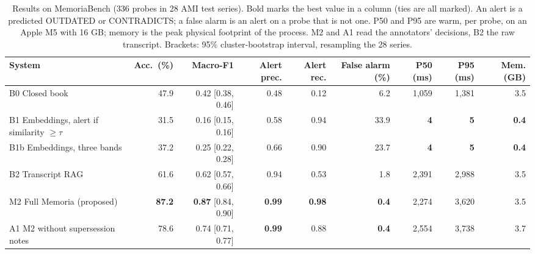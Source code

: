 \begin{table}[tbp]
\centering
\small
\caption{Results on MemoriaBench (336 probes in 28 AMI test series). Bold marks the best value in a column (ties are all marked). An alert is a predicted OUTDATED or CONTRADICTS; a false alarm is an alert on a probe that is not one. P50 and P95 are warm, per probe, on an Apple M5 with 16 GB; memory is the peak physical footprint of the process. M2 and A1 read the annotators' decisions, B2 the raw transcript. Brackets: 95\% cluster-bootstrap interval, resampling the 28 series.}
\label{tab:memoriabench-main}
\begin{tabular}{@{}lrrrrrrrr@{}}
\toprule
System & Acc.\ (\%) & Macro-F1 & Alert prec. & Alert rec. & False alarm (\%) & P50 (ms) & P95 (ms) & Mem. (GB) \\
\midrule
B0 Closed book & 47.9 & 0.42 {\scriptsize [0.38, 0.46]} & 0.48 & 0.12 & 6.2 & 1{,}059 & 1{,}381 & 3.5 \\
B1 Embeddings, alert if similarity $\ge \tau$ & 31.5 & 0.16 {\scriptsize [0.15, 0.16]} & 0.58 & 0.94 & 33.9 & \textbf{4} & \textbf{5} & \textbf{0.4} \\
B1b Embeddings, three bands & 37.2 & 0.25 {\scriptsize [0.22, 0.28]} & 0.66 & 0.90 & 23.7 & \textbf{4} & \textbf{5} & \textbf{0.4} \\
B2 Transcript RAG & 61.6 & 0.62 {\scriptsize [0.57, 0.66]} & 0.94 & 0.53 & 1.8 & 2{,}391 & 2{,}988 & 3.5 \\
\midrule
M2 Full Memoria (proposed) & \textbf{87.2} & \textbf{0.87} {\scriptsize [0.84, 0.90]} & \textbf{0.99} & \textbf{0.98} & \textbf{0.4} & 2{,}274 & 3{,}620 & 3.5 \\
A1 M2 without supersession notes & 78.6 & 0.74 {\scriptsize [0.71, 0.77]} & \textbf{0.99} & 0.88 & \textbf{0.4} & 2{,}554 & 3{,}738 & 3.7 \\
\bottomrule
\end{tabular}
\end{table}

